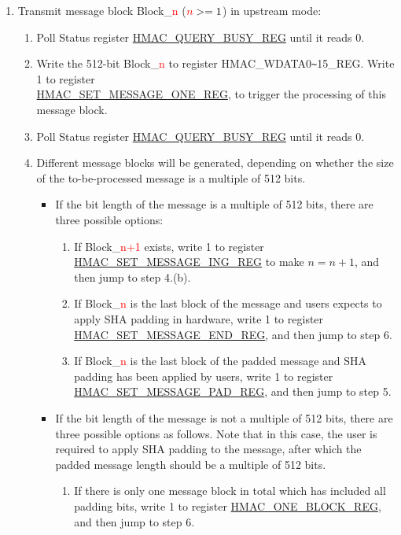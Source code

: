 \documentclass[main\_\_EN.tex]{subfiles}
\begin{document}
\begin{enumerate}
    \item Transmit message block Block\_\textcolor{red}{n} ($\textcolor{red}{n}>=1$) in upstream mode:
    \begin{enumerate}
        \item Poll Status register \hyperref[regdesc:HMACQUERYBUSYREG]{HMAC\_QUERY\_BUSY\_REG} until it reads 0.
        \item Write the 512-bit Block\_\textcolor{red}{n} to register HMAC\_WDATA0\verb+~+15\_REG. Write 1 to register\\ \hyperref[regdesc:HMACSETMESSAGEONEREG]{HMAC\_SET\_MESSAGE\_ONE\_REG}, to trigger the processing of this message block.
        \item Poll Status register \hyperref[regdesc:HMACQUERYBUSYREG]{HMAC\_QUERY\_BUSY\_REG} until it reads 0.
        \item Different message blocks will be generated, depending on whether the size of the to-be-processed message is a multiple of 512 bits.
        \begin{itemize}
            \item If the bit length of the message is a multiple of 512 bits, there are three possible options:
            \begin{enumerate}
                \item If Block\_\textcolor{red}{n+1} exists, write 1 to register \hyperref[regdesc:HMACSETMESSAGEINGREG]{HMAC\_SET\_MESSAGE\_ING\_REG} to make $n=n+1$, and then jump to step 4.(b).
                \item If Block\_\textcolor{red}{n} is the last block of the message and users expects to apply SHA padding in hardware, write 1 to register \hyperref[regdesc:HMACSETMESSAGEENDREG]{HMAC\_SET\_MESSAGE\_END\_REG}, and then jump to step 6.
                \item If Block\_\textcolor{red}{n} is the last block of the padded message and SHA padding has been applied by users, write 1 to register \hyperref[regdesc:HMACSETMESSAGEPADREG]{HMAC\_SET\_MESSAGE\_PAD\_REG}, and then jump to step 5.
            \end{enumerate}
            \item If the bit length of the message is not a multiple of 512 bits, there are three possible options as follows. Note that in this case, the user is required to apply SHA padding to the message, after which the padded message length should be a multiple of 512 bits.
            \begin{enumerate}
                \item If there is only one message block in total which has included all padding bits, write 1 to register \hyperref[regdesc:HMACONEBLOCKREG]{HMAC\_ONE\_BLOCK\_REG}, and then jump to step 6.

\end{enumerate}
\end{itemize}
\end{enumerate}
\end{enumerate}
\end{document}
